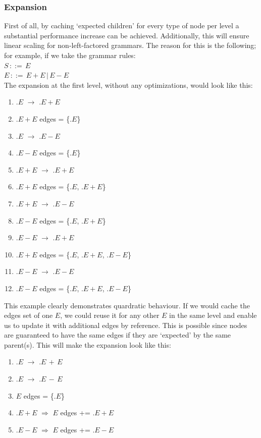 \documentclass[a4paper,10pt]{article}
\begin{document}
\subsubsection{Expansion}
\label{subsec:nodeExpansionOptimization}
First of all, by caching `expected children' for every type of node per level a substantial performance increase can be achieved. Additionally, this will ensure linear scaling for non-left-factored grammars. The reason for this is the following; for example, if we take the grammar rules:\\
$S\,::=\,E$\\
$E\,::=\,E + E\,|\,E - E$\\
The expansion at the first level, without any optimizations, would look like this:
\begin{enumerate}
 \setlength{\itemsep}{0pt}
 \setlength{\parskip}{0pt}
 \setlength{\parsep}{0pt}
 
 \item $.E$ $\rightarrow$ $.E+E$
 \item $.E+E$ edges = \{$.E$\}
 \item $.E$ $\rightarrow$ $.E-E$
 \item $.E-E$ edges = \{$.E$\}
 \item $.E+E$ $\rightarrow$ $.E+E$
 \item $.E+E$ edges = \{$.E$, $.E+E$\}
 \item $.E+E$ $\rightarrow$ $.E-E$
 \item $.E-E$ edges = \{$.E$, $.E+E$\}
 \item $.E-E$ $\rightarrow$ $.E+E$
 \item $.E+E$ edges = \{$.E$, $.E+E$, $.E-E$\}
 \item $.E-E$ $\rightarrow$ $.E-E$
 \item $.E-E$ edges = \{$.E$, $.E+E$, $.E-E$\}
\end{enumerate}
This example clearly demonstrates quardratic behaviour. If we would cache the edges set of one $E$, we could reuse it for any other $E$ in the same level and enable us to update it with additional edges by reference. This is possible since nodes are guaranteed to have the same edges if they are `expected' by the same parent(s). This will make the expansion look like this:
\begin{enumerate}
 \setlength{\itemsep}{0pt}
 \setlength{\parskip}{0pt}
 \setlength{\parsep}{0pt}
 
 \item $.E$ $\rightarrow$ $.E\,+\,E$
 \item $.E$ $\rightarrow$ $.E\,-\,E$
 \item $E$ edges = \{$.E$\}
 \item $.E+E$ $\Rightarrow$ $E$ edges += $.E+E$
 \item $.E-E$ $\Rightarrow$ $E$ edges += $.E-E$
\end{enumerate}
\end{document}
